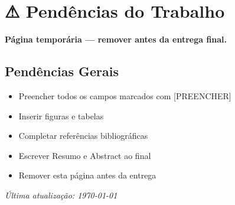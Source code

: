 \chapter*{⚠ Pendências do Trabalho}
\begin{center}{\large\bfseries Página temporária — remover antes da entrega final.}\end{center}
\vspace{1em}

\section*{Pendências Gerais}
\begin{itemize}
  \item[$\square$] Preencher todos os campos marcados com [PREENCHER]
  \item[$\square$] Inserir figuras e tabelas
  \item[$\square$] Completar referências bibliográficas
  \item[$\square$] Escrever Resumo e Abstract ao final
  \item[$\square$] Remover esta página antes da entrega
\end{itemize}
\begin{center}\textit{Última atualização: \today}\end{center}
\cleardoublepage
